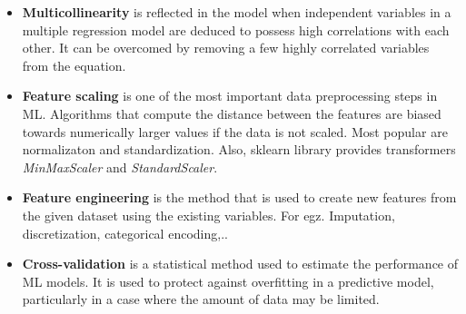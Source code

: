 \documentclass[
  letterpaper,
  DIV=11,
  numbers=noendperiod]{scrreprt}
\begin{document}
\begin{itemize}
\item
  \textbf{Multicollinearity} is reflected in the model when independent
  variables in a multiple regression model are deduced to possess high
  correlations with each other. It can be overcomed by removing a few
  highly correlated variables from the equation.
\item
  \textbf{Feature scaling} is one of the most important data
  preprocessing steps in ML. Algorithms that compute the distance
  between the features are biased towards numerically larger values if
  the data is not scaled. Most popular are normalizaton and
  standardization. Also, sklearn library provides transformers
  \emph{MinMaxScaler} and \emph{StandardScaler}.
\item
  \textbf{Feature engineering} is the method that is used to create new
  features from the given dataset using the existing variables. For egz.
  Imputation, discretization, categorical encoding,..
\item
  \textbf{Cross-validation} is a statistical method used to estimate the
  performance of ML models. It is used to protect against overfitting in
  a predictive model, particularly in a case where the amount of data
  may be limited.


\end{itemize}
\end{document}
